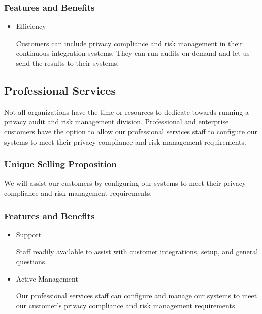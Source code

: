 \subsubsection*{Features and Benefits}

\begin{itemize}

\item Efficiency

Customers can include privacy compliance and risk management in their continuous integration systems. They can run audits on-demand and let us send the results to their systems.

\end{itemize}


\subsection{Professional Services}

Not all organizations have the time or resources to dedicate towards running a privacy audit and risk management division. Professional and enterprise customers have the option to allow our professional services staff to configure our systems to meet their privacy compliance and risk management requirements.

\subsubsection*{Unique Selling Proposition}

We will assist our customers by configuring our systems to meet their privacy compliance and risk management requirements.

\subsubsection*{Features and Benefits}

\begin{itemize}

\item Support

Staff readily available to assist with customer integrations, setup, and general questions.

\item Active Management

Our professional services staff can configure and manage our systems to meet our customer's privacy compliance and risk management requirements.

\end{itemize}


